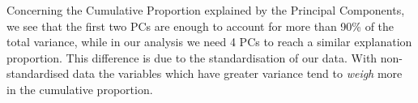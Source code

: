 \documentclass[a4paper,11pt,oneside]{report}
\begin{document}
	Concerning the Cumulative Proportion explained by the Principal Components, we see that the first two PCs are enough to account for more than 90\% of the total variance, while in our analysis we need 4 PCs to reach a similar explanation proportion.
	This difference is due to the standardisation of our data. With non-standardised data the variables which have greater variance tend to \textit{weigh} more in the cumulative proportion.

	
\end{document}
